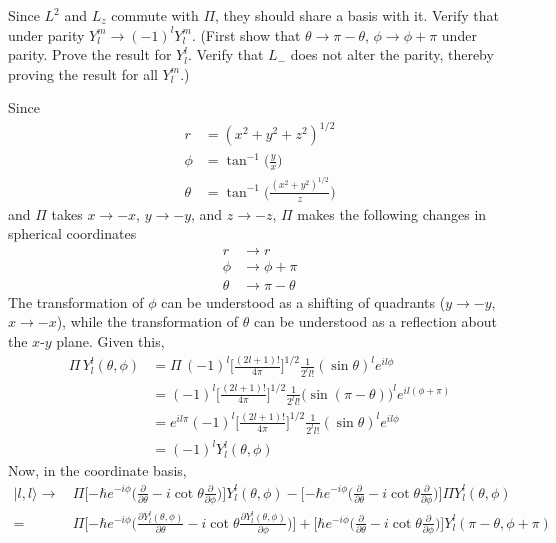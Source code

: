 \documentclass[../principles-of-quantum-mechanics.tex]{subfiles}
\begin{document}
\begin{questions}
		\question Since $L^2$ and $L_z$ commute with $\Pi$, they should share a basis with it. Verify that under parity $Y_l^m \to (-1)^l Y_l^m$. (First show that $\theta \to \pi - \theta$, $\phi \to \phi + \pi$ under parity. Prove the result for $Y_l^l$. Verify that $L_-$ does not alter the parity, thereby proving the result for all $Y_l^m$.)
		
		\begin{solution}
			Since
			\begin{align*}
				r &= (x^2 + y^2 + z^2)^{1/2} \\
				\phi &= \tan^{-1}\Big(\frac{y}{x}\Big) \\
				\theta &= \tan^{-1}\Big(\frac{(x^2 + y^2)^{1/2}}{z}\Big)
			\end{align*}
			and $\Pi$ takes $x\to{-x}$, $y\to{-y}$, and $z\to{-z}$, $\Pi$ makes the following changes in spherical coordinates
			\begin{align*}
				r &\to r \\
				\phi &\to \phi + \pi \\
				\theta &\to \pi - \theta
			\end{align*}
			The transformation of $\phi$ can be understood as a shifting of quadrants ($y \to {-y}$, $x \to {-x}$), while the transformation of $\theta$ can be understood as a reflection about the $x$-$y$ plane. Given this, 
			\begin{align*}
				\Pi\,Y_l^l(\theta, \phi) &= \Pi\,(-1)^l\Big[\frac{(2l + 1)!}{4\pi}\Big]^{1/2}\frac{1}{2^ll!}(\sin\theta)^l e^{il\phi} \\
				&= (-1)^l\Big[\frac{(2l + 1)!}{4\pi}\Big]^{1/2}\frac{1}{2^ll!}\big(\sin(\pi - \theta)\big)^l e^{il(\phi + \pi)} \\
				&= e^{il\pi}(-1)^l\Big[\frac{(2l + 1)!}{4\pi}\Big]^{1/2}\frac{1}{2^ll!}(\sin\theta)^l e^{il\phi} \\
				&= (-1)^lY_l^l(\theta, \phi)
			\end{align*} 
			Now, in the coordinate basis,
			\begin{align*}
				[\Pi, L_-]|l, l\rangle \to\,&\Pi\Big[{-\hbar e^{-i\phi}}\Big(\frac{\partial}{\partial\theta} - i\cot\theta\frac{\partial}{\partial\phi}\Big)\Big]Y_l^l(\theta, \phi) - \Big[{-\hbar e^{-i\phi}}\Big(\frac{\partial}{\partial\theta} - i\cot\theta\frac{\partial}{\partial\phi}\Big)\Big]\Pi Y_l^l(\theta, \phi) \\
				=\,&\Pi\Big[{-\hbar e^{-i\phi}}\Big(\frac{\partial Y_l^l(\theta, \phi)}{\partial \theta} - i\cot\theta\frac{\partial Y_l^l(\theta, \phi)}{\partial \phi}\Big)\Big] + \Big[{\hbar e^{-i\phi}}\Big(\frac{\partial}{\partial\theta} - i\cot\theta\frac{\partial}{\partial\phi}\Big)\Big]Y_l^l(\pi - \theta, \phi + \pi) \\

\end{align*}
\end{solution}
\end{questions}
\end{document}
